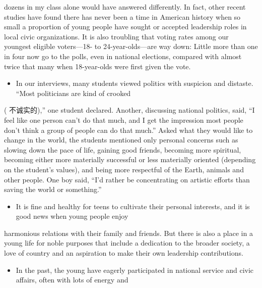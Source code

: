 \documentclass[UTF8,11pt]{ctexart}
\begin{document}
dozens in my class alone would have answered differently. In fact, other recent studies have found there has never been a time in American history when so small a proportion of young people have sought or accepted leadership roles in local civic organizations. It is also troubling that voting rates among our youngest eligible voters—18- to 24-year-olds—are way down: Little more than one in four now go to the polls, even in national elections, compared with almost twice that many when 18-year-olds were first given the vote.


\begin{itemize}[leftmargin=2em,itemsep=.2em,topsep=.4em]\item[J.] In our interviews, many students viewed politics with suspicion and distaste. “Most politicians are kind of crooked
\end{itemize}

( 不诚实的),” one student declared. Another, discussing national politics, said, “I feel like one person can’t do that much, and I get the impression most people don’t think a group of people can do that much.” Asked what they would like to change in the world, the students mentioned only personal concerns such as slowing down the pace of life, gaining good friends, becoming more spiritual, becoming either more materially successful or less materially oriented (depending on the student’s values), and being more respectful of the Earth, animals and other people. One boy said, “I’d rather be concentrating on artistic efforts than saving the world or something.”


\begin{itemize}[leftmargin=2em,itemsep=.2em,topsep=.4em]\item[K.] It is fine and healthy for teens to cultivate their personal interests, and it is good news when young people enjoy
\end{itemize}

harmonious relations with their family and friends. But there is also a place in a young life for noble purposes that include a dedication to the broader society, a love of country and an aspiration to make their own leadership contributions.


\begin{itemize}[leftmargin=2em,itemsep=.2em,topsep=.4em]\item[L.] In the past, the young have eagerly participated in national service and civic affairs, often with lots of energy and
\end{itemize}
\end{document}
